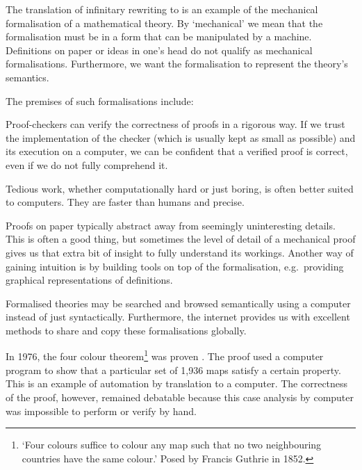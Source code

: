 The translation of infinitary rewriting to \Coq is an example of the
mechanical formalisation of a mathematical theory. By `mechanical' we
mean that the formalisation must be in a form that can be manipulated
by a machine. Definitions on paper or ideas in one's head do not
qualify as mechanical formalisations. Furthermore, we want the
formalisation to represent the theory's semantics.

The premises of such formalisations include:
\begin{compactdesc}
  \item[\normalfont{\emph{Confidence}}\hskip .5em]
    Proof-checkers can verify the correctness of proofs in a rigorous
    way. If we trust the implementation of the checker (which is
    usually kept as small as possible) and its execution on a
    computer, we can be confident that a verified proof is correct,
    even if we do not fully comprehend it.
  \item[\normalfont{\emph{Automation}}\hskip .5em]
    Tedious work, whether computationally hard or just boring, is
    often better suited to computers. They are faster than humans and
    precise.
  \item[\normalfont{\emph{Intuition}}\hskip .5em]
    Proofs on paper typically abstract away from seemingly
    uninteresting  details. This is often a good thing, but sometimes
    the level of detail of a mechanical proof gives us that extra bit
    of insight to fully understand its workings. Another way of
    gaining intuition is by building tools on top of the
    formalisation, e.g.\ providing graphical representations of
    definitions.
  \item[\normalfont{\emph{Availability}}\hskip .5em]
    Formalised theories may be searched and browsed semantically using
    a computer instead of just syntactically. Furthermore, the
    internet provides us with excellent methods to share and copy
    these formalisations globally.
\end{compactdesc}

In 1976, the four colour theorem\footnote{`Four colours suffice to
  colour any map such that no two neighbouring countries have the same
  colour.' Posed by Francis Guthrie in 1852. } was proven
\citep{appel-haken-76}. The proof used a computer program to show that
a particular set of 1,936 maps satisfy a certain property. This is an
example of automation by translation to a computer. The correctness of
the proof, however, remained debatable because this case analysis by
computer was impossible to perform or verify by hand.

